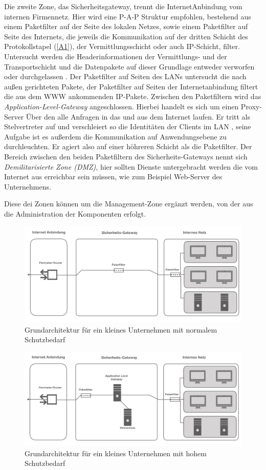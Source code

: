 Die zweite Zone, das Sicherheitsgateway, trennt die InternetAnbindung vom internen Firmennetz. Hier wird eine P-A-P Struktur empfohlen, bestehend aus einem Paketfilter auf der Seite des lokalen Netzes, sowie einem Paketfilter auf Seite des Internets, die jeweils die Kommunikation auf der dritten Schicht des Protokollstapel (\ref{A1}), der Vermittlungsschicht oder auch IP-Schicht, filter. Untersucht werden die Headerinformationen der Vermittlungs- und der Transportschicht und die Datenpakete auf dieser Grundlage entweder verworfen oder durchgelassen  \cite{isi-lana}.
 Der Paketfilter auf Seiten des LANs untersucht die nach außen gerichteten Pakete, der Paketfilter auf Seiten der Internetanbindung filtert die aus dem WWW ankommenden IP-Pakete. Zwischen den Paketfiltern wird das \emph{Application-Level-Gateway} angeschlossen. Hierbei handelt es sich um einen Proxy-Server Über den alle Anfragen in das und aus dem Internet laufen. Er tritt als Stelvertreter auf und verschleiert so die Identitäten der  Clients im LAN \cite{zisler2018computer}, seine Aufgabe ist es außerdem die Kommunikation auf Anwendungsebene zu durchleuchten. Er agiert also auf einer höhreren Schicht als die Paketfilter. 
 Der Bereich zwischen den beiden Paketfiltern des Sicherheits-Gateways nennt sich \emph{Demilitarisierte Zone (DMZ)}, hier sollten Dienste untergebracht werden die vom Internet aus erreichbar sein müssen, wie zum Beispiel Web-Server des Unternehmens. 
 
Diese dei Zonen können um die Management-Zone ergänzt werden, von der aus die Administration der Komponenten erfolgt.
\begin{figure}
	\includegraphics[width=\linewidth]{klUnternHoch.jpeg}
	\caption{Grundarchitektur für ein kleines Unternehmen mit normalem Schutzbedarf}
	\label{klUnorm}
\end{figure}

\begin{figure}
	\includegraphics[width= \linewidth]{klUnternehmnorm}
	\caption{Grundarchitektur für ein kleines Unternehmen mit hohem Schutzbedarf}
	\label{klUhoch}
\end{figure}

